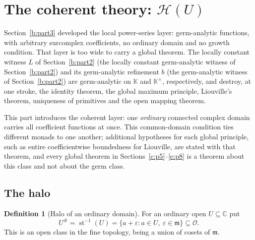 \documentclass[11pt,a4paper]{article}
\numberwithin{equation}{section}
\theoremstyle{definition}
\newtheorem{definition}[theorem]{Definition}
\theoremstyle{remark}
\theoremstyle{plain}
\newcommand{\K}{\mathbb K}
\newcommand{\CC}{\mathbb C}
\newcommand{\Ov}{\mathcal O}
\newcommand{\mm}{\mathfrak m}
\DeclareMathOperator{\st}{st}
\newcommand{\halo}[1]{#1^{\#}}
\newcommand{\Hc}{\mathcal H}
\begin{document}

\section{The coherent theory: \texorpdfstring{$\Hc(U)$}{H(U)}}
\label{c:p4}

Section~\ref{b:part3} developed the local power-series layer: germ-analytic functions,
with arbitrary surcomplex coefficients, no ordinary domain and no growth
condition. That layer is too wide to carry a global theorem. The
locally constant witness $L$ of Section~\ref{b:part2}
(the locally constant germ-analytic witness of Section~\ref{b:part2}) and its germ-analytic refinement
$b$ (the germ-analytic witness of Section~\ref{b:part2}) are germ-analytic on $\K$ and
$\K^\times$, respectively, and
destroy, at one stroke, the identity theorem, the global maximum
principle, Liouville's theorem, uniqueness of primitives and the open
mapping theorem.

This part introduces the coherent layer: one \emph{ordinary} connected
complex domain carries all coefficient functions at once. This common-domain
condition ties different monads to one another; additional hypotheses
for each global principle, such as entire coefficientwise boundedness
for Liouville, are stated with that theorem, and every global theorem in
Sections~\ref{c:p5}--\ref{e:p8} is a theorem about this class and not about
the germ class.

\subsection{The halo}
\label{c:p4:halo}

\begin{definition}[Halo of an ordinary domain]\label{c:p4:def-halo}
For an ordinary open $U\subseteq\CC$ put
\begin{equation}\label{c:p4:eq-halo}
 \halo U=\st^{-1}(U)=\{a+\varepsilon: a\in U,\ \varepsilon\in\mm\}
 \subseteq\Ov .
\end{equation}
This is an open class in the fine topology, being a union of cosets of
$\mm$.
\end{definition}
\end{document}
